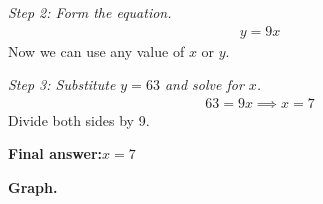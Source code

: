 \documentclass[11pt]{article}
\begin{document}
\textit{Step 2: Form the equation.}
\[\begin{gathered}
y = 9x
\end{gathered}\]
Now we can use any value of \( x \) or \( y \).

\textit{Step 3: Substitute \( y = 63 \) and solve for \( x \).}
\[\begin{gathered}
63 = 9x \implies x = 7
\end{gathered}\]
Divide both sides by 9.

\begin{answerbox}
\textbf{Final answer:}\quad \(\displaystyle  x = 7 \)
\end{answerbox}
\textbf{Graph.}

\begin{center}
\end{center}
\end{document}
